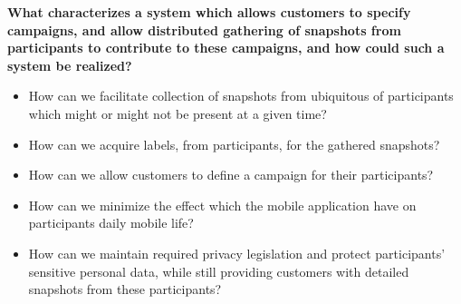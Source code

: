 

\textbf{What characterizes a system which allows customers to specify campaigns, and allow distributed gathering of snapshots from participants to contribute to these campaigns, and how could such a system be realized?}

\begin{itemize}
	\setlength\itemsep{-0.2em}
    \item How can we facilitate collection of snapshots from ubiquitous of participants which might or might not be present at a given time?

    \item How can we acquire labels, from participants, for the gathered snapshots?  
    
    \item How can we allow customers to define a campaign for their participants?
    
    \item How can we minimize the effect which the mobile application have on participants daily mobile life?

    \item How can we maintain required privacy legislation and protect participants' sensitive personal data, while still providing customers with detailed snapshots from these participants? 
\end{itemize}

